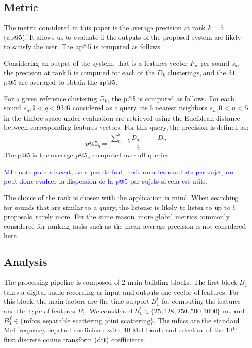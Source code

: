 \documentclass{bmcart}
\newcommand{\ml}[1]{\textcolor{blue}{ML: #1}}
\begin{document}
\subsection*{Metric}

The metric considered in this paper is the average precision at rank $k=5$ (ap@5). It allows us to evaluate if the outputs of the proposed system are likely to satisfy the user. The ap@5 is computed as follows.

Considering an output of the system, that is a features vector $F_n$ per sound $s_n$, the precision at rank $5$ is computed for each of the $D_k$ clusterings, and the $31$ p@5 are averaged to obtain the ap@5.

For a given reference clustering $D_k$, the p@5 is computed as follows. For each sound $s_q, 0<q<9346$ considered as a query, its 5 nearest neighbors $s_n, 0<n<5$ in the timbre space under evaluation are retrieved using the Euclidean distance between corresponding features vectors. For this query, the precision is defined as:
$$
p@5_q = \frac{\sum_{n=5}^5 D_q==D_n}{5}
$$
The p@5 is the average $p@5_q$ computed over all queries.

\ml{note pour vincent, on a pas de fold, mais on a les resultats par sujet, on peut donc evaluer la dispersion de la p@5 par sujets si cela est utile.}

The choice of the rank is chosen with the application in mind. When searching for sounds that are similar to a query, the listener is likely to listen to up to $5$ proposals, rarely more. For the same reason, more global metrics commonly considered for ranking tasks such as the mean average precision is not considered here.

\subsection*{Analysis}

The processing pipeline is composed of 2 main building blocks. The first block $B_1$ takes a digital audio recording as input and outputs one vector of features. For this block, the main factors are the time support $B_1^t$ for computing the features and the type of features $B_1^f$. We considered $B_1^t \in \{ 25, 128, 250, 500, 1000 \}$ ms and $B_1^f \in \{ \text{mfccs}, \text{separable scattering}, \text{joint scattering} \}$. The mfccs are the standard Mel frequency cepstral coefficients with 40 Mel bands and selection of the 13$^\text{th}$ first discrete cosine transform (dct) coefficients.
\end{document}
